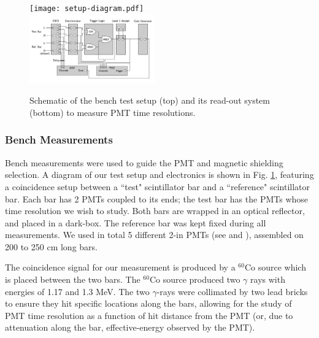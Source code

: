 \documentclass[3p,final,twocolumn]{elsarticle}
\begin{document}
\begin{figure}[th!]
	\centering
		\texttt{[image: setup-diagram.pdf]} \\
		\includegraphics[width=0.48\textwidth]{electr_setup.png}
	\caption{Schematic of the bench test setup (top) and its
          read-out system (bottom) to measure PMT time resolutions. }
	\label{fig:test_stand_setup}
\end{figure}

\subsubsection{Bench Measurements}
Bench measurements were used to guide the PMT and magnetic shielding
selection.  A diagram of our test setup and electronics is shown in
Fig. \ref{fig:test_stand_setup}, featuring a coincidence setup between
a ``test" scintillator bar and a ``reference" scintillator bar.  Each
bar has 2 PMTs coupled to its ends; the test bar has the PMTs whose
time resolution we wish to study.  Both bars are wrapped in an optical
reflector, and placed in a dark-box.  The reference bar was kept fixed
during all measurements.  We used in total 5 different 2-in PMTs (see
\cite{hamapmts} and \cite{pmt9214}), assembled on 200 to 250
\si{\centi\meter} long bars.

The coincidence signal for our measurement is produced by a $^{60}$Co source which is placed between the two bars. 
The $^{60}$Co source produced two $\gamma$ rays with energies of 1.17 and 1.3 \si{\mega\electronvolt}. 
The two $\gamma$-rays were collimated by two lead bricks to ensure they hit specific locations along the bars, 
allowing for the study of PMT time resolution as a function of hit distance from the PMT (or, due to attenuation along the bar, effective-energy observed by the PMT).
\end{document}
